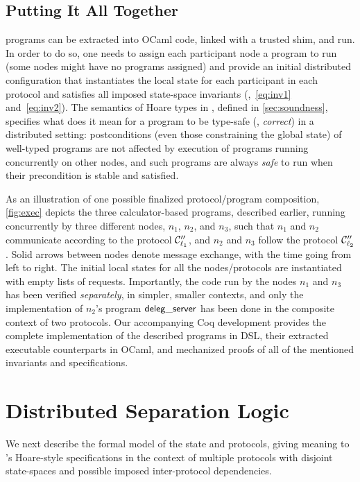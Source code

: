 \subsection{Putting It All Together}
\label{sec:all-together}

\disel programs can be extracted into OCaml code, linked with a
trusted shim, and run. In order to do so, one needs to assign each
participant node a program to run (some nodes might have no programs
assigned) and provide an initial distributed configuration that
instantiates the local state for each participant in each protocol and
satisfies all imposed state-space invariants (\eg,~\eqref{eq:inv1}
and~\eqref{eq:inv2}). The semantics of Hoare types in \disel, defined
in \cref{sec:soundness}, specifies what does it mean for a
program to be type-safe (\ie, \emph{correct}) in a distributed
setting: postconditions (even those constraining the global state) of
well-typed programs are not affected by execution of programs running
concurrently on other nodes, and such programs are always \emph{safe}
to run when their precondition is stable and satisfied.

As an illustration of one possible finalized protocol/program
composition, \cref{fig:exec} depicts the three calculator-based
programs, described earlier, running concurrently by three different
nodes, $n_1$, $n_2$, and $n_3$, such that $n_1$ and $n_2$ communicate
according to the protocol $\mathcal{C}''_{\ell_1}$, and $n_2$ and $n_3$
follow the protocol $\mathcal{C}''_{\ell_2}$.
%
Solid arrows between nodes denote message exchange, with the time
going from left to right.  The initial local states for all the
nodes/protocols are instantiated with empty lists of requests.
%
Importantly, the code run by the nodes $n_1$ and $n_3$ has been
verified \emph{separately}, in simpler, smaller contexts, and only the
implementation of $n_2$'s program $\mathsf{deleg\_server}$ has been done in the
composite context of two protocols.
%
Our accompanying Coq development provides the complete implementation
of the described programs in \disel DSL, their extracted executable
counterparts in OCaml, and mechanized proofs of all of the mentioned
invariants and specifications.

\section{Distributed Separation Logic}
\label{sec:logic}

We next describe the formal model of the state and protocols, giving
meaning to \disel's Hoare-style specifications in the context of
multiple protocols with disjoint state-spaces and possible
imposed inter-protocol dependencies.

